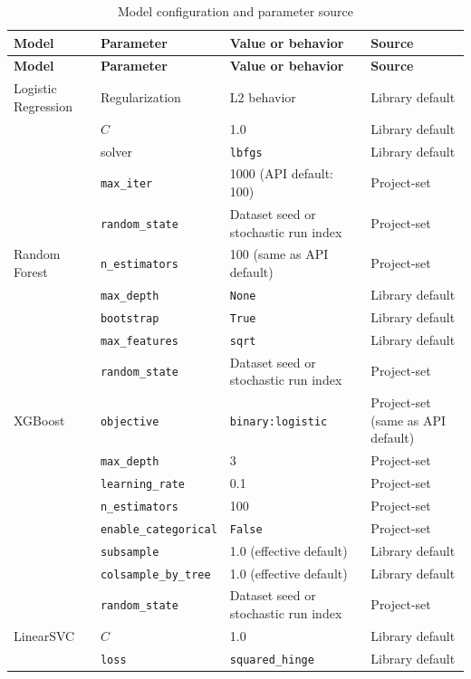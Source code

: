 \documentclass[12pt]{article}
\begin{document}
\begin{longtable}{@{}p{2cm}p{3.75cm}p{5.1cm}p{3.45cm}@{}}
\caption{Model configuration and parameter source}\label{tab:model-configurations}\\
\toprule
\textbf{Model} & \textbf{Parameter} & \textbf{Value or behavior} & \textbf{Source} \\
\midrule
\endfirsthead
\toprule
\textbf{Model} & \textbf{Parameter} & \textbf{Value or behavior} & \textbf{Source} \\
\midrule
\endhead
\bottomrule
\endfoot
Logistic Regression & Regularization & L2 behavior & Library default \\
& $C$ & 1.0 & Library default \\
& solver & \texttt{lbfgs} & Library default \\
& \texttt{max\_iter} & 1000 (API default: 100) & Project-set \\
& \texttt{random\_state} & Dataset seed or stochastic run index & Project-set \\
\midrule
Random Forest & \texttt{n\_estimators} & 100 (same as API default) & Project-set \\
& \texttt{max\_depth} & \texttt{None} & Library default \\
& \texttt{bootstrap} & \texttt{True} & Library default \\
& \texttt{max\_features} & \texttt{sqrt} & Library default \\
& \texttt{random\_state} & Dataset seed or stochastic run index & Project-set \\
\midrule
XGBoost & \texttt{objective} & \texttt{binary:logistic} & Project-set (same as API default) \\
& \texttt{max\_depth} & 3 & Project-set \\
& \texttt{learning\_rate} & 0.1 & Project-set \\
& \texttt{n\_estimators} & 100 & Project-set \\
& \texttt{enable\_categorical} & \texttt{False} & Project-set \\
& \texttt{subsample} & 1.0 (effective default) & Library default \\
& \texttt{colsample\_by\_tree} & 1.0 (effective default) & Library default \\
& \texttt{random\_state} & Dataset seed or stochastic run index & Project-set \\
\midrule
LinearSVC & $C$ & 1.0 & Library default \\
& \texttt{loss} & \texttt{squared\_hinge} & Library default \\

\end{longtable}
\end{document}
